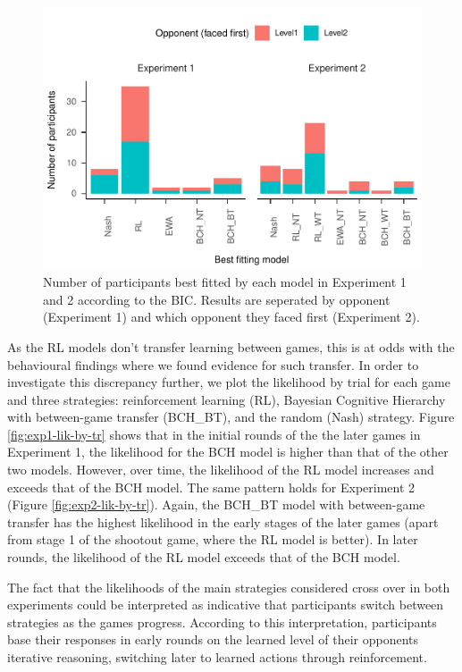 \documentclass[smallextended]{svjour3}       %
\begin{document}
\begin{figure}

{\centering \includegraphics[width=\textwidth]{CBB_v2_files/figure-latex/exp-comp-models-1} 

}

\caption{Number of participants best fitted by each model  in Experiment 1 and 2 according to the BIC. Results are seperated by opponent (Experiment 1) and which opponent they faced first (Experiment 2).}\label{fig:exp-comp-models}
\end{figure}

As the RL models don't transfer learning between games, this is at odds
with the behavioural findings where we found evidence for such transfer.
In order to investigate this discrepancy further, we plot the likelihood
by trial for each game and three strategies: reinforcement learning
(RL), Bayesian Cognitive Hierarchy with between-game transfer (BCH\_BT),
and the random (Nash) strategy. Figure \ref{fig:exp1-lik-by-tr} shows
that in the initial rounds of the the later games in Experiment 1, the
likelihood for the BCH model is higher than that of the other two
models. However, over time, the likelihood of the RL model increases and
exceeds that of the BCH model. The same pattern holds for Experiment 2
(Figure \ref{fig:exp2-lik-by-tr}). Again, the BCH\_BT model with
between-game transfer has the highest likelihood in the early stages of
the later games (apart from stage 1 of the shootout game, where the RL
model is better). In later rounds, the likelihood of the RL model
exceeds that of the BCH model.

The fact that the likelihoods of the main strategies considered cross
over in both experiments could be interpreted as indicative that
participants switch between strategies as the games progress. According
to this interpretation, participants base their responses in early
rounds on the learned level of their opponents iterative reasoning,
switching later to learned actions through reinforcement.
\end{document}
